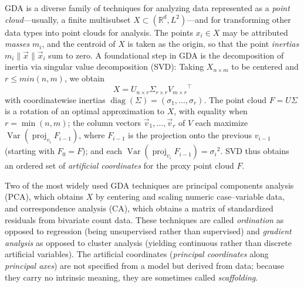\documentclass[
]{article}
\begin{document}
GDA is a diverse family of techniques for analyzing data represented as
a \emph{point cloud}---usually, a finite multisubset
\(X \subset (\mathbb{R}^d, L^2)\)---and for transforming other data
types into point clouds for analysis. The points \(x_i \in X\) may be
attributed \emph{masses} \(m_i\), and the centroid of \(X\) is taken as
the origin, so that the point \emph{inertias}
\(m_i \lVert \vec{x} \rVert \vec{x}_i\) sum to zero. A foundational step
in GDA is the decomposition of inertia via singular value decomposition
(SVD): Taking \(X_{n \times m}\) to be centered and \(r \leq min(n,m)\),
we obtain
\[ X = U_{n \times r} \Sigma_{r \times r} {V_{m \times r}}^\top \] with
coordinatewise inertias
\(\operatorname{diag}(\Sigma) = (\sigma_1,\ldots,\sigma_r)\). The point
cloud \(F = U\Sigma\) is a rotation of an optimal approximation to
\(X\), with equality when \(r = \min(n,m)\); the column vectors
\(\vec{v}_1,\ldots,\vec{v}_r\) of \(V\) each maximize
\(\operatorname{Var}(\operatorname{proj}_{v_i}F_{i-1})\), where
\(F_{i-1}\) is the projection onto the previous \(v_{i-1}\) (starting
with \(F_0 = F\)); and each
\(\operatorname{Var}(\operatorname{proj}_{v_i}F_{i-1}) = {\sigma_i}^2\).
SVD thus obtains an ordered set of \emph{artificial coordinates} for the
proxy point cloud \(F\).

Two of the most widely used GDA techniques are principal components
analysis (PCA), which obtains \(X\) by centering and scaling numeric
case--variable data, and correspondence analysis (CA), which obtains a
matrix of standardized residuals from bivariate count data. These
techniques are called \emph{ordination} as opposed to regression (being
unsupervised rather than supervised) and \emph{gradient analysis} as
opposed to cluster analysis (yielding continuous rather than discrete
artificial variables). The artificial coordinates (\emph{principal
coordinates} along \emph{principal axes}) are not specified from a model
but derived from data; because they carry no intrinsic meaning, they are
sometimes called \emph{scaffolding}.
\end{document}
